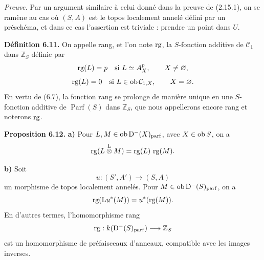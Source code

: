 \documentclass[11pt]{article}
\newcommand{\cl}{\operatorname{cl}}
\newcommand{\Parf}{\operatorname{Parf}}
\newcommand{\Tor}{\operatorname{Tor}}
\providecommand{\cC}{\mathcal C}
\providecommand{\Tor}{\operatorname{Tor}}
\providecommand{\Ker}{\operatorname{Ker}}
\begin{document}
\emph{Preuve.} Par un argument similaire à celui donné dans la preuve de (2.15.1), on se ramène au cas où \((S,A)\) est le topos localement annelé défini par un préschéma, et dans ce cas l'assertion est triviale : prendre un point dans \(U\).

\textbf{Définition 6.11.} On appelle rang, et l'on note \(\rg\), la \(S\)-fonction additive de \(\mathcal C_1\) dans \(\mathbb Z_S\) définie par
\[
  \rg(L)=p\quad\text{si } L\simeq A_X^p,
  \qquad X\ne\varnothing,
\]
\[
  \rg(L)=0\quad\text{si } L\in\Ob\mathcal C_{1,X},
  \qquad X=\varnothing.
\]
En vertu de (6.7), la fonction rang se prolonge de manière unique en une \(S\)-fonction additive de \(\Parf(S)\) dans \(\mathbb Z_S\), que nous appellerons encore rang et noterons \(\rg\).

\textbf{Proposition 6.12.} \textbf{a)} Pour \(L,M\in\Ob\Dpx^-(X)_{\mathrm{parf}}\), avec \(X\in\Ob S\), on a
\[
  \rg(L\overset{\mathrm L}{\otimes} M)=\rg(L)\,\rg(M).
\]

\textbf{b)} Soit
\[
  u:(S',A')\longrightarrow(S,A)
\]
un morphisme de topos localement annelés. Pour \(M\in\Ob\Dpx^-(S)_{\mathrm{parf}}\), on a
\[
  \rg(\mathrm L u^*(M))=u^*(\rg(M)).
\]
En d'autres termes, l'homomorphisme rang
\[
  \rg:k(\Dpx^-(S)_{\mathrm{parf}})\longrightarrow \mathbb Z_S
\]
est un homomorphisme de préfaisceaux d'anneaux, compatible avec les images inverses.



\providecommand{\Cpx}{\mathrm C}
\providecommand{\Kpx}{\mathrm K}
\providecommand{\Dpx}{\mathrm D}
\providecommand{\Ho}{\mathrm H}
\providecommand{\Ob}{\operatorname{ob}}
\providecommand{\Hom}{\operatorname{Hom}}
\providecommand{\RHom}{\mathrm R\!\operatorname{Hom}}
\providecommand{\Ext}{\operatorname{Ext}}
\providecommand{\Tor}{\operatorname{Tor}}
\providecommand{\Tr}{\operatorname{Tr}}
\providecommand{\Add}{\operatorname{Add}}
\providecommand{\Cart}{\operatorname{Cart}}
\providecommand{\Parf}{\operatorname{Parf}}
\providecommand{\coh}{\operatorname{coh}}
\providecommand{\amp}{\operatorname{amp}}
\providecommand{\cl}{\operatorname{cl}}
\providecommand{\rg}{\operatorname{rg}}
\providecommand{\Id}{\operatorname{Id}}
\providecommand{\Ker}{\operatorname{Ker}}
\providecommand{\Im}{\operatorname{Im}}
\providecommand{\cH}{\mathcal H}
\providecommand{\Zs}{\mathbb Z_S}
\providecommand{\A}{\mathcal A}
\providecommand{\cC}{\mathcal C}
\providecommand{\cCzero}{\mathcal C_0}
\providecommand{\otL}{\mathop{\otimes}^{\mathrm L}}
\providecommand{\tamp}{\operatorname{tor.amp}}
\providecommand{\pamp}{\operatorname{parf.amp}}
\providecommand{\pdim}{\operatorname{parf.dim}}
\providecommand{\bon}{\mathrm b}
\providecommand{\parf}{\operatorname{parf}}
\providecommand{\parff}{\operatorname{parf}}
\providecommand{\ac}{\mathrm{ac}}
\end{document}
